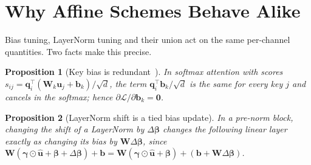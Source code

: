 \documentclass[fonts]{icst}
\newtheorem{proposition}{Proposition}
\begin{document}
\begin{table}[!t]
\centering
\caption{Measured cost on an NVIDIA A100-40GB (fp32, $224\times224$). Train: batch 32, forward + backward + Adam step. Infer: batch 1. Ckpt: size of the stored trainable tensors.}
\label{tab:cost}
\end{table}

\section{Why Affine Schemes Behave Alike}
\label{sec:analysis}

Bias tuning, LayerNorm tuning and their union act on the same per-channel quantities. Two facts make this precise.

\begin{proposition}[Key bias is redundant~\cite{namazifar2023bias}]
\label{prop:key}
In softmax attention with scores $s_{ij}=\mathbf{q}_i^\top(\mathbf{W}_k\mathbf{u}_j+\mathbf{b}_k)/\sqrt{d}$, the term $\mathbf{q}_i^\top\mathbf{b}_k/\sqrt{d}$ is the same for every key $j$ and cancels in the softmax; hence $\partial\mathcal{L}/\partial\mathbf{b}_k=\mathbf{0}$.
\end{proposition}

\begin{proposition}[LayerNorm shift is a tied bias update]
\label{prop:fold}
In a pre-norm block, changing the shift of a LayerNorm by $\Delta\boldsymbol{\beta}$ changes the following linear layer exactly as changing its bias by $\mathbf{W}\Delta\boldsymbol{\beta}$, since $\mathbf{W}(\boldsymbol{\gamma}\odot\hat{\mathbf{u}}+\boldsymbol{\beta}+\Delta\boldsymbol{\beta})+\mathbf{b}=\mathbf{W}(\boldsymbol{\gamma}\odot\hat{\mathbf{u}}+\boldsymbol{\beta})+(\mathbf{b}+\mathbf{W}\Delta\boldsymbol{\beta})$.
\end{proposition}
\end{document}
